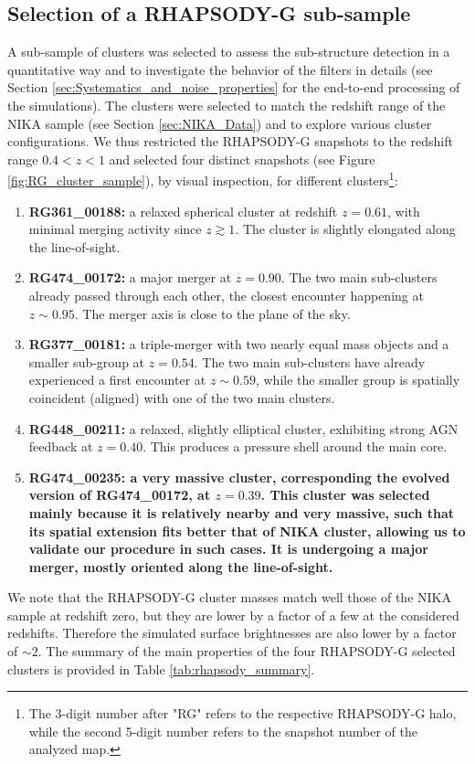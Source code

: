 \documentclass[twocolumn,traditabstract]{aa}
\begin{document}
\subsection{Selection of a RHAPSODY-G sub-sample}\label{sec:Selection_of_a_RHAPSODY-G_sub-sample}
A sub-sample of clusters was selected to assess the sub-structure detection in a quantitative way and to investigate the behavior of the filters in details (see Section \ref{sec:Systematics_and_noise_properties} for the end-to-end processing of the simulations). The clusters were selected to match the redshift range of the NIKA sample (see Section \ref{sec:NIKA_Data}) and to explore various cluster configurations. We thus restricted the RHAPSODY-G snapshots to the redshift range $0.4<z<1$ and selected four distinct snapshots (see Figure \ref{fig:RG_cluster_sample}), by visual inspection, for different clusters\footnote{The 3-digit number after "RG" refers to the respective RHAPSODY-G halo, while the second 5-digit number refers to the snapshot number of the analyzed map.}:
\begin{enumerate}
\item {\bf RG361\_00188:} a relaxed spherical cluster at redshift $z = 0.61$, with minimal merging activity since $z \gtrsim 1$. The cluster is slightly elongated along the line-of-sight.
\item {\bf RG474\_00172:} a major merger at $z = 0.90$. The two main sub-clusters already passed through each other, the closest encounter happening at $z \sim 0.95$. The merger axis is close to the plane of the sky. 
\item {\bf RG377\_00181:} a triple-merger with two nearly equal mass objects and a smaller sub-group at $z = 0.54$. The two main sub-clusters have already experienced a first encounter at $z \sim 0.59$, while the smaller group is spatially coincident (aligned) with one of the two main clusters.
\item {\bf RG448\_00211:} a relaxed, slightly elliptical cluster, exhibiting strong AGN feedback at $z = 0.40$. This produces a pressure shell around the main core.
\item {\bf {\bf RG474\_00235:} a very massive cluster, corresponding the evolved version of RG474\_00172, at $z = 0.39$. This cluster was selected mainly because it is relatively nearby and very massive, such that its spatial extension fits better that of NIKA cluster, allowing us to validate our procedure in such cases. It is undergoing a major merger, mostly oriented along the line-of-sight.}
\end{enumerate}
We note that the RHAPSODY-G cluster masses match well those of the NIKA sample at redshift zero, but they are lower by a factor of a few at the considered redshifts. Therefore the simulated surface brightnesses are also lower by a factor of $\sim 2$. The summary of the main properties of the four RHAPSODY-G selected clusters is provided in Table \ref{tab:rhapsody_summary}.
\end{document}
